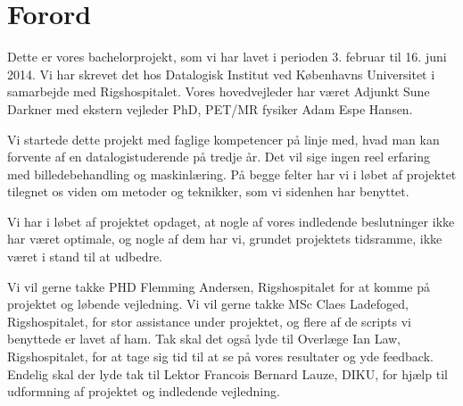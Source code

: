 \section{Forord}

Dette er vores bachelorprojekt, som vi har lavet i perioden 3.
februar til 16. juni 2014. Vi har skrevet det hos Datalogisk Institut
ved Københavns Universitet i samarbejde med Rigshospitalet. Vores
hovedvejleder har været Adjunkt Sune Darkner med ekstern vejleder PhD,
PET/MR fysiker Adam Espe Hansen.

Vi startede dette projekt med faglige kompetencer på linje med, hvad
man kan forvente af en datalogistuderende på tredje år. Det vil sige
ingen reel erfaring med billedebehandling og maskinlæring. På begge
felter har vi i løbet af projektet tilegnet os viden om metoder og
teknikker, som vi sidenhen har benyttet.

Vi har i løbet af projektet opdaget, at nogle af vores indledende
beslutninger ikke har været optimale, og nogle af dem har vi, grundet
projektets tidsramme, ikke været i stand til at udbedre.

Vi vil gerne takke PHD Flemming Andersen, Rigshospitalet for at komme på
projektet og løbende vejledning. Vi vil gerne takke MSc Claes Ladefoged,
Rigshospitalet, for stor assistance under projektet, og flere af de
scripts vi benyttede er lavet af ham. Tak skal det også lyde til Overlæge Ian Law, Rigshospitalet, for at tage sig tid til at se på vores resultater og yde feedback.
Endelig skal der lyde tak til Lektor Francois Bernard Lauze, DIKU, for
hjælp til udformning af projektet og indledende vejledning.


